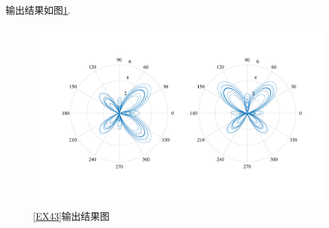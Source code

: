 输出结果如图\ref{OEX43}.
\begin{figure}[!htb]
	\centering
	\vspace*{-1em}
	\includegraphics[width=0.8\linewidth]{pic/极坐标图.pdf}
	\vspace*{-5em}
	\caption{\ref{EX43}输出结果图}
	\label{OEX43}
\end{figure}
